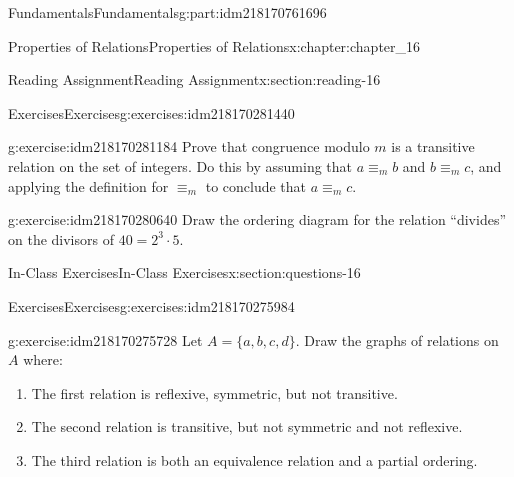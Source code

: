 \documentclass[oneside,10pt,]{book}
\numberwithin{equation}{section}
\begin{document}
\begin{partptx}{Fundamentals}{}{Fundamentals}{}{}{g:part:idm218170761696}
\begin{chapterptx}{Properties of Relations}{}{Properties of Relations}{}{}{x:chapter:chapter_16}
\begin{sectionptx}{Reading Assignment}{}{Reading Assignment}{}{}{x:section:reading-16}
\typeout{************************************************}
%
\begin{exercises-subsection-numberless}{Exercises}{}{Exercises}{}{}{g:exercises:idm218170281440}
\par\medskip\noindent%
%
\begin{exercisegroup}
\begin{divisionexerciseeg}{1}{}{}{g:exercise:idm218170281184}%
Prove that congruence modulo \(m\) is a transitive relation on the set of integers. Do this by assuming that \(a \equiv_m b \) and \(b\equiv_m c\), and applying the definition for \(\equiv_m\) to conclude that \(a \equiv_m c\).%
\end{divisionexerciseeg}%
\begin{divisionexerciseeg}{2}{}{}{g:exercise:idm218170280640}%
Draw the ordering diagram for the relation ``divides'' on the divisors of \(40=2^3 \cdot 5\).%
\end{divisionexerciseeg}%
\end{exercisegroup}
\par\medskip\noindent
\end{exercises-subsection-numberless}
\end{sectionptx}
%
%
\typeout{************************************************}
\typeout{************************************************}
%
\begin{sectionptx}{In-Class Exercises}{}{In-Class Exercises}{}{}{x:section:questions-16}
%
%
%
\typeout{************************************************}
\typeout{************************************************}
%
\begin{exercises-subsection-numberless}{Exercises}{}{Exercises}{}{}{g:exercises:idm218170275984}
\par\medskip\noindent%
%
\begin{exercisegroup}
\begin{divisionexerciseeg}{1}{}{}{g:exercise:idm218170275728}%
Let \(A = \{a, b, c, d\}\). Draw the graphs of relations on \(A\) where:%
\begin{enumerate}[label=(\alph*)]
\item{}The first relation is  reflexive, symmetric, but not transitive.%
\item{}The second relation is transitive, but not symmetric and not reflexive.%
\item{}The third relation is both an equivalence relation and a partial ordering.%

\end{enumerate}
\end{divisionexerciseeg}
\end{exercisegroup}
\end{exercises-subsection-numberless}
\end{sectionptx}
\end{chapterptx}
\end{partptx}
\end{document}

